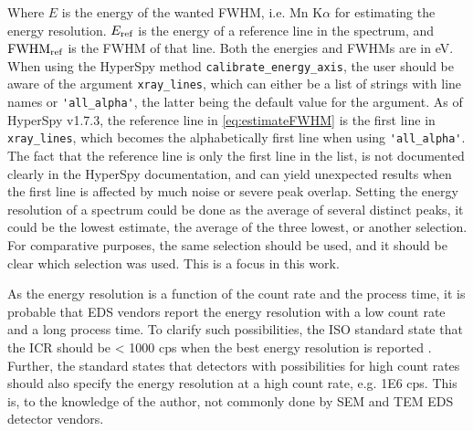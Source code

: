 Where $E$ is the energy of the wanted FWHM, i.e. Mn K$\alpha$ for estimating the energy resolution.
$E_\textnormal{ref}$ is the energy of a reference line in the spectrum, and $\textnormal{FWHM}_{\textnormal{ref}}$ is the FWHM of that line.
Both the energies and FWHMs are in eV.
When using the HyperSpy method \verb|calibrate_energy_axis|, the user should be aware of the argument \verb|xray_lines|, which can either be a list of strings with line names or \verb|'all_alpha'|, the latter being the default value for the argument.
As of HyperSpy v1.7.3, the reference line in \cref{eq:estimateFWHM} is the first line in \verb|xray_lines|, which becomes the alphabetically first line when using \verb|'all_alpha'|.
The fact that the reference line is only the first line in the list, is not documented clearly in the HyperSpy documentation, and can yield unexpected results when the first line is affected by much noise or severe peak overlap.
Setting the energy resolution of a spectrum could be done as the average of several distinct peaks, it could be the lowest estimate, the average of the three lowest, or another selection.
For comparative purposes, the same selection should be used, and it should be clear which selection was used.
This is a focus in this work.


As the energy resolution is a function of the count rate and the process time, it is probable that EDS vendors report the energy resolution with a low count rate and a long process time.
To clarify such possibilities, the ISO standard state that the ICR should be < 1000 cps when the best energy resolution is reported \cite{iso_qc_15632}.
Further, the standard states that detectors with possibilities for high count rates should also specify the energy resolution at a high count rate, e.g. 1E6 cps.
This is, to the knowledge of the author, not commonly done by SEM and TEM EDS detector vendors.




